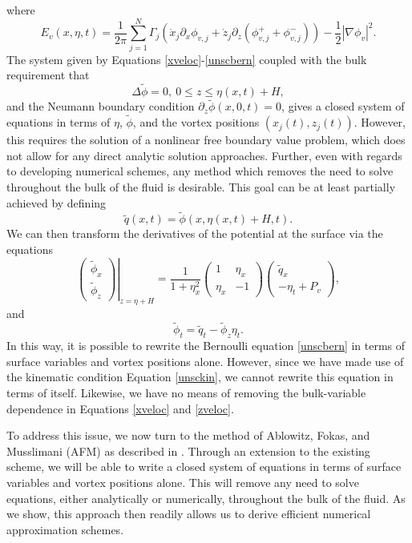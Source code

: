 \documentclass[a4paper,11pt]{article}
\newcommand{\bp}{\begin{pmatrix}}
\newcommand{\ep}{\end{pmatrix}}
\newcommand{\p}{\partial}
\begin{document}
where
\[
E_{v}(x,\eta,t) = \frac{1}{2\pi}\sum_{j=1}^{N}\Gamma_{j}\left(\dot{x}_{j}\p_{x}\phi_{v,j} + \dot{z}_{j} \p_{z}\left(\phi_{v,j}^{+} + \phi_{v,j}^{-}\right)  \right) - \frac{1}{2}\left| \nabla \phi_{v} \right|^{2}.
\]
The system given by Equations \eqref{xveloc}-\eqref{unscbern} coupled with the bulk requirement that 
\begin{equation}
\Delta \tilde{\phi} = 0, ~ 0\leq z \leq \eta(x,t)+H,
\label{harmon} 
\end{equation}
and the Neumann boundary condition $\p_{z}\tilde{\phi}(x,0,t)=0$, gives a closed system of equations in terms of $\eta$, $\tilde{\phi}$, and the vortex positions $(x_{j}(t),z_{j}(t))$.  However, this requires the solution of a nonlinear free boundary value problem, which does not allow for any direct analytic solution approaches.  Further, even with regards to developing numerical schemes, any method which removes the need to solve throughout the bulk of the fluid is desirable.
This goal can be at least partially achieved by defining 
\[
\tilde{q}(x,t) = \tilde{\phi}(x,\eta(x,t)+H,t).
\]
We can then transform the derivatives of the potential at the surface via the equations
\begin{equation}
\left.\bp\tilde{\phi}_{x}\\ \tilde{\phi}_{z}\ep\right|_{z=\eta + H} = \frac{1}{1+\eta_{x}^{2}}\bp 1 & \eta_{x}\\ \eta_{x} & -1\ep\bp\tilde{q}_{x} \\  -\eta_{t} + P_{v}\ep,
\label{phitrans}
\end{equation}
and
\begin{equation}
\tilde{\phi}_{t} = \tilde{q}_{t}-\tilde{\phi}_{z}\eta_{t}.
\label{phittrans}
\end{equation}
In this way, it is possible to rewrite the Bernoulli equation \eqref{unscbern} in terms of surface variables and vortex positions alone.  However, since we have made use of the kinematic condition Equation \eqref{unsckin}, we cannot rewrite this equation in terms of itself.  Likewise, we have no means of removing the bulk-variable dependence in Equations \eqref{xveloc} and \eqref{zveloc}.

To address this issue, we now turn to the method of Ablowitz, Fokas, and Musslimani (AFM) as described in \cite{afm}.  Through an extension to the existing scheme, we will be able to write a closed system of equations in terms of surface variables and vortex positions alone.  This will remove any need to solve equations, either analytically or numerically, throughout the bulk of the fluid.  As we show, this approach then readily allows us to derive efficient numerical approximation schemes.
\end{document}
